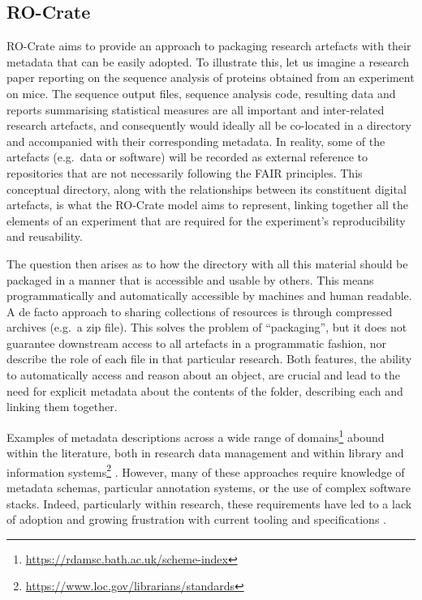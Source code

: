 \subsection{RO-Crate}\label{ch5:rocrate}

RO-Crate aims to provide an approach to packaging research artefacts
with their metadata that can be easily adopted. To illustrate this, let
us imagine a research paper reporting on the sequence analysis of
proteins obtained from an experiment on mice. The sequence output files,
sequence analysis code, resulting data and reports summarising
statistical measures are all important and inter-related research
artefacts, and consequently would ideally all be co-located in a
directory and accompanied with their corresponding metadata. In reality,
some of the artefacts (e.g.~data or software) will be recorded as
external reference to repositories that are not necessarily following
the FAIR principles. This conceptual directory, along with the
relationships between its constituent digital artefacts, is what the
RO-Crate model aims to represent, linking together all the elements of
an experiment that are required for the experiment's reproducibility and
reusability.

The question then arises as to how the directory with all this material
should be packaged in a manner that is accessible and usable by others.
This means programmatically and automatically accessible by machines and
human readable. A de facto approach to sharing collections of resources
is through compressed archives (e.g.~a zip file). This solves the
problem of ``packaging'', but it does not guarantee downstream access to
all artefacts in a programmatic fashion, nor describe the role of each
file in that particular research. Both features, the ability to
automatically access and reason about an object, are crucial and lead to
the need for explicit metadata about the contents of the folder,
describing each and linking them together.

Examples of metadata descriptions across a wide range of
domains\footnote{\url{https://rdamsc.bath.ac.uk/scheme-index}} abound within the
literature, both in research data management
\cite{Amorim 2016,ch5-46,ch5-75}
and within library and information
systems\footnote{\url{https://www.loc.gov/librarians/standards}} \cite{Mai Chan 1995,ch5-127}. However, many of these approaches require
knowledge of metadata schemas, particular annotation systems, or the
use of complex software stacks. Indeed, particularly within research,
these requirements have led to a lack of adoption and growing
frustration with current tooling and specifications
\cite{ch5-94,ch5-119,ch5-102}.

